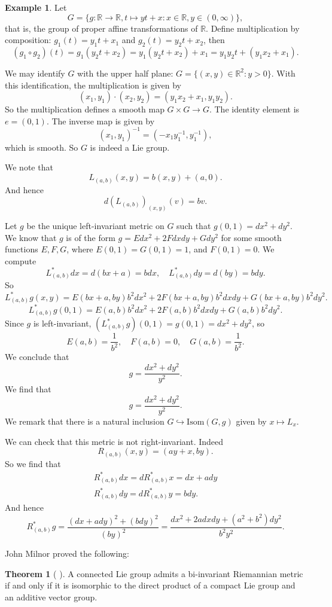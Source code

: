 \documentclass{amsart}
\numberwithin{equation}{section}
\newcommand{\bR}{\mathbb{R}}
\theoremstyle{definition}
\newtheorem{example}[definition]{Example}
\theoremstyle{theorem}
\newtheorem{theorem}[definition]{Theorem}
\begin{document}
\begin{example}
Let 
$$
G = \{g : \bR \to \bR,  t\mapsto  yt + x :  x \in \bR, y \in (0,\infty)\},
$$
that is, the group of proper affine transformations of $\bR$. Define multiplication by composition: $g_1(t) = y_1t + x_1$ and $g_2(t) = y_2t + x_2$, then 
\[
(g_1 \circ g_2)(t) = g_1(y_2 t+ x_2)= y_1(y_2t+x_2) + x_1 = y_1y_2 t + (y_1 x_2+x_1).
\]


We may identify $G$ with the upper half plane: $G=\{(x,y)\in \bR^2: y>0\}$. With this identification, the multiplication 
is given by
\[
(x_1, y_1) \cdot (x_2, y_2) = (y_1x_2 + x_1, y_1y_2). 
\]
So the multiplication defines a smooth map $G\times G\to G$. The identity element is $e = (0,1)$. The inverse map is given by 
\[
(x_1, y_1)^{-1} = (-x_1y_1^{-1}, y_1^{-1}),
\]
which is smooth. So $G$ is indeed a Lie group. 

We note that 
\[
L_{(a,b)}(x,y) = b(x,y) + (a,0).
\]
And hence 
\[
d(L_{(a,b)})_{(x,y)}(v) = bv. 
\]


Let $g$ be the unique left-invariant metric on $G$ such that $g(0,1) =  dx^2 + dy^2$. We know that $g$ is of the form $g = Edx^2 + 2Fdxdy + Gdy^2$ for some smooth 
functions $E,F,G$, where $E(0,1)=G(0,1)=1$, and $F(0,1)=0$. We compute
$$
L^*_{(a,b)}dx = d (bx+a)=bdx,\quad
L^*_{(a,b)}dy = d(by)=bdy.
$$
So
$$
L_{(a,b)}^*g(x,y) = E(bx+a,by)b^2 dx^2 + 2F(bx+a,by)b^2 dxdy + G(bx+a,by)b^2 dy^2.
$$
$$
L_{(a,b)}^*g(0,1) = E(a,b)b^2 dx^2 + 2F(a,b)b^2 dxdy + G(a,b)b^2 dy^2.
$$
Since $g$ is left-invariant, $(L_{(a,b)}^*g)(0,1)= g(0,1)= dx^2 + dy^2$, so 
$$
E(a,b)=\frac{1}{b^2},\quad F(a,b)=0,\quad G(a,b)=\frac{1}{b^2}.
$$
We conclude that 
$$
g=\frac{dx^2+dy^2}{y^2}.
$$
We find that 
\[
g = \frac{dx^2 + dy^2}{y^2}. 
\]
We remark that there is a natural inclusion $G \hookrightarrow \text{Isom}(G,g)$ given by $x \mapsto L_x$. 

We can check that this metric is not right-invariant. Indeed 
\[
R_{(a,b)}(x,y) = (ay + x, by).
\]
So we find that 
\begin{align*}
R_{(a,b)}^*dx = dR_{(a,b)}^*x = dx + ady \\
R_{(a,b)}^*dy = dR_{(a,b)}^*y = bdy.
\end{align*}
And hence 
\[
R^*_{(a,b)} g = \frac{ (dx+ady)^2 + (bdy)^2}{(by)^2}= \frac{dx^2 + 2a dxdy + (a^2 + b^2)dy^2}{b^2y^2}.
\]
\end{example}

\medskip


John Milnor proved the following:
\begin{theorem}[{
\cite[Lemma 7.5]{Mi}}]
A connected Lie group admits a bi-invariant Riemannian metric if and only
if it is isomorphic to the direct product of a compact Lie group and an additive vector group.
\end{theorem}
\end{document}
